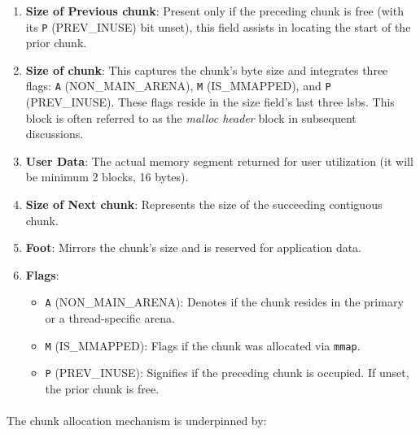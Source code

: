         \begin{enumerate}
            \item \textbf{Size of Previous \gls{chunk}}: Present only if the preceding \gls{chunk} is free (with its \texttt{P} (PREV\_INUSE) bit unset), this field assists in locating the start of the prior \gls{chunk}.
            
            \item \textbf{Size of \gls{chunk}}: This captures the \gls{chunk}'s byte size and integrates three flags: \texttt{A} (NON\_MAIN\_ARENA), \texttt{M} (IS\_MMAPPED), and \texttt{P} (PREV\_INUSE). These flags reside in the size field's last three \acrshort{lsb}s. This block is often referred to as the \textit{malloc header} block in subsequent discussions.
            
            \item \textbf{User Data}: The actual memory segment returned for user utilization (it will be minimum 2 blocks, 16 bytes).
            
            \item \textbf{Size of Next \gls{chunk}}: Represents the size of the succeeding contiguous \gls{chunk}.
            
            \item \textbf{Foot}: Mirrors the \gls{chunk}'s size and is reserved for application data.
            
            \item \textbf{Flags}:
            \begin{itemize}
                \item \texttt{A} (NON\_MAIN\_ARENA): Denotes if the \gls{chunk} resides in the primary or a thread-specific arena.
                \item \texttt{M} (IS\_MMAPPED): Flags if the \gls{chunk} was allocated via \texttt{mmap}.
                \item \texttt{P} (PREV\_INUSE): Signifies if the preceding \gls{chunk} is occupied. If unset, the prior \gls{chunk} is free.
            \end{itemize}
        \end{enumerate}
        
        \paragraph{}The \gls{chunk} allocation mechanism is underpinned by:
        
